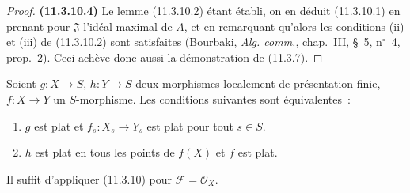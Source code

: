 \begin{proof}
\label{IV.11.3.10.4-fr}
\noindent\textbf{(11.3.10.4)} Le lemme (11.3.10.2) étant établi, on en déduit
(11.3.10.1) en prenant pour $\mathfrak J$ l'idéal maximal de $A$, et en
remarquant qu'alors les conditions (ii) et (iii) de (11.3.10.2) sont
satisfaites (Bourbaki, \emph{Alg. comm.}, chap.~III, \S~5, n$^\circ$~4,
prop.~2). Ceci achève donc aussi la démonstration de (11.3.7).
\end{proof}

\begin{corollary}[11.3.11]
\label{IV.11.3.11-fr}
Soient $g:X\to S$, $h:Y\to S$ deux morphismes localement de présentation
finie, $f:X\to Y$ un $S$-morphisme. Les conditions suivantes sont
équivalentes~:
\begin{enumerate}[label=\emph{\alph*)}]
\item $g$ est plat et $f_s:X_s\to Y_s$ est plat pour tout $s\in S$.
\item $h$ est plat en tous les points de $f(X)$ et $f$ est plat.
\end{enumerate}
\end{corollary}

Il suffit d'appliquer (11.3.10) pour $\mathcal F=\mathcal O_X$.

